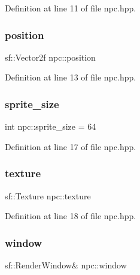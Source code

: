 Definition at line 11 of file npc.\+hpp.

\mbox{\label{classnpc_af27f0e211e77578a73b34c7ea094d82b}} 
\subsubsection{\texorpdfstring{position}{position}}
{\footnotesize\ttfamily sf\+::\+Vector2f npc\+::position\hspace{0.3cm}{\ttfamily [private]}}



Definition at line 13 of file npc.\+hpp.

\mbox{\label{classnpc_a662c915f75653537fcbffcef96087a48}} 
\subsubsection{\texorpdfstring{sprite\+\_\+size}{sprite\_size}}
{\footnotesize\ttfamily int npc\+::sprite\+\_\+size = 64\hspace{0.3cm}{\ttfamily [private]}}



Definition at line 17 of file npc.\+hpp.

\mbox{\label{classnpc_ade5118e0c4c299eea10fda2d8a6611f6}} 
\subsubsection{\texorpdfstring{texture}{texture}}
{\footnotesize\ttfamily sf\+::\+Texture npc\+::texture\hspace{0.3cm}{\ttfamily [private]}}



Definition at line 18 of file npc.\+hpp.

\mbox{\label{classnpc_a7fde3d3012e4dff0d02bf882fa466fc6}} 
\subsubsection{\texorpdfstring{window}{window}}
{\footnotesize\ttfamily sf\+::\+Render\+Window\& npc\+::window\hspace{0.3cm}{\ttfamily [private]}}



